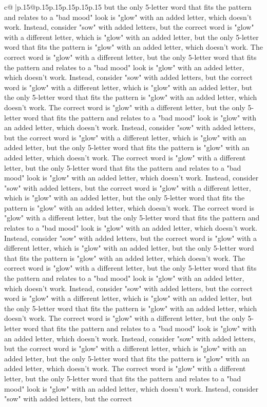\documentclass{article}
\begin{document}
{\begin{supertabular}{c@{$\;$}|p{.15\linewidth}@{}p{.15\linewidth}p{.15\linewidth}p{.15\linewidth}p{.15\linewidth}p{.15\linewidth}}
{{{but the only 5{-}letter word that fits the pattern and relates to a "bad mood" look is "glow" with an added letter, which doesn't work. Instead, consider "sow" with added letters, but the correct word is "glow" with a different letter, which is "glow" with an added letter, but the only 5{-}letter word that fits the pattern is "glow" with an added letter, which doesn't work. The correct word is "glow" with a different letter, but the only 5{-}letter word that fits the pattern and relates to a "bad mood" look is "glow" with an added letter, which doesn't work. Instead, consider "sow" with added letters, but the correct word is "glow" with a different letter, which is "glow" with an added letter, but the only 5{-}letter word that fits the pattern is "glow" with an added letter, which doesn't work. The correct word is "glow" with a different letter, but the only 5{-}letter word that fits the pattern and relates to a "bad mood" look is "glow" with an added letter, which doesn't work. Instead, consider "sow" with added letters, but the correct word is "glow" with a different letter, which is "glow" with an added letter, but the only 5{-}letter word that fits the pattern is "glow" with an added letter, which doesn't work. The correct word is "glow" with a different letter, but the only 5{-}letter word that fits the pattern and relates to a "bad mood" look is "glow" with an added letter, which doesn't work. Instead, consider "sow" with added letters, but the correct word is "glow" with a different letter, which is "glow" with an added letter, but the only 5{-}letter word that fits the pattern is "glow" with an added letter, which doesn't work. The correct word is "glow" with a different letter, but the only 5{-}letter word that fits the pattern and relates to a "bad mood" look is "glow" with an added letter, which doesn't work. Instead, consider "sow" with added letters, but the correct word is "glow" with a different letter, which is "glow" with an added letter, but the only 5{-}letter word that fits the pattern is "glow" with an added letter, which doesn't work. The correct word is "glow" with a different letter, but the only 5{-}letter word that fits the pattern and relates to a "bad mood" look is "glow" with an added letter, which doesn't work. Instead, consider "sow" with added letters, but the correct word is "glow" with a different letter, which is "glow" with an added letter, but the only 5{-}letter word that fits the pattern is "glow" with an added letter, which doesn't work. The correct word is "glow" with a different letter, but the only 5{-}letter word that fits the pattern and relates to a "bad mood" look is "glow" with an added letter, which doesn't work. Instead, consider "sow" with added letters, but the correct word is "glow" with a different letter, which is "glow" with an added letter, but the only 5{-}letter word that fits the pattern is "glow" with an added letter, which doesn't work. The correct word is "glow" with a different letter, but the only 5{-}letter word that fits the pattern and relates to a "bad mood" look is "glow" with an added letter, which doesn't work. Instead, consider "sow" with added letters, but the correct }}}
\end{supertabular}}
\end{document}
